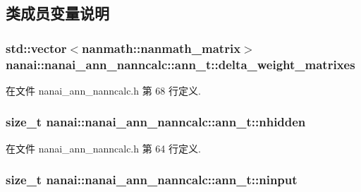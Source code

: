 \subsection{类成员变量说明}
\hypertarget{classnanai_1_1nanai__ann__nanncalc_1_1ann__t_a93502dededbb4046a63e86a3858d4f1c}{}
\subsubsection[{delta\+\_\+weight\+\_\+matrixes}]{\setlength{\rightskip}{0pt plus 5cm}std\+::vector$<${\bf nanmath\+::nanmath\+\_\+matrix}$>$ nanai\+::nanai\+\_\+ann\+\_\+nanncalc\+::ann\+\_\+t\+::delta\+\_\+weight\+\_\+matrixes}\label{classnanai_1_1nanai__ann__nanncalc_1_1ann__t_a93502dededbb4046a63e86a3858d4f1c}


在文件 nanai\+\_\+ann\+\_\+nanncalc.\+h 第 68 行定义.

\hypertarget{classnanai_1_1nanai__ann__nanncalc_1_1ann__t_aae78b45e2e8e764fbf1797fd8663c299}{}
\subsubsection[{nhidden}]{\setlength{\rightskip}{0pt plus 5cm}size\+\_\+t nanai\+::nanai\+\_\+ann\+\_\+nanncalc\+::ann\+\_\+t\+::nhidden}\label{classnanai_1_1nanai__ann__nanncalc_1_1ann__t_aae78b45e2e8e764fbf1797fd8663c299}


在文件 nanai\+\_\+ann\+\_\+nanncalc.\+h 第 64 行定义.

\hypertarget{classnanai_1_1nanai__ann__nanncalc_1_1ann__t_ac1d98edc134d7b8aaf44c2d9c3516a1f}{}
\subsubsection[{ninput}]{\setlength{\rightskip}{0pt plus 5cm}size\+\_\+t nanai\+::nanai\+\_\+ann\+\_\+nanncalc\+::ann\+\_\+t\+::ninput}\label{classnanai_1_1nanai__ann__nanncalc_1_1ann__t_ac1d98edc134d7b8aaf44c2d9c3516a1f}


